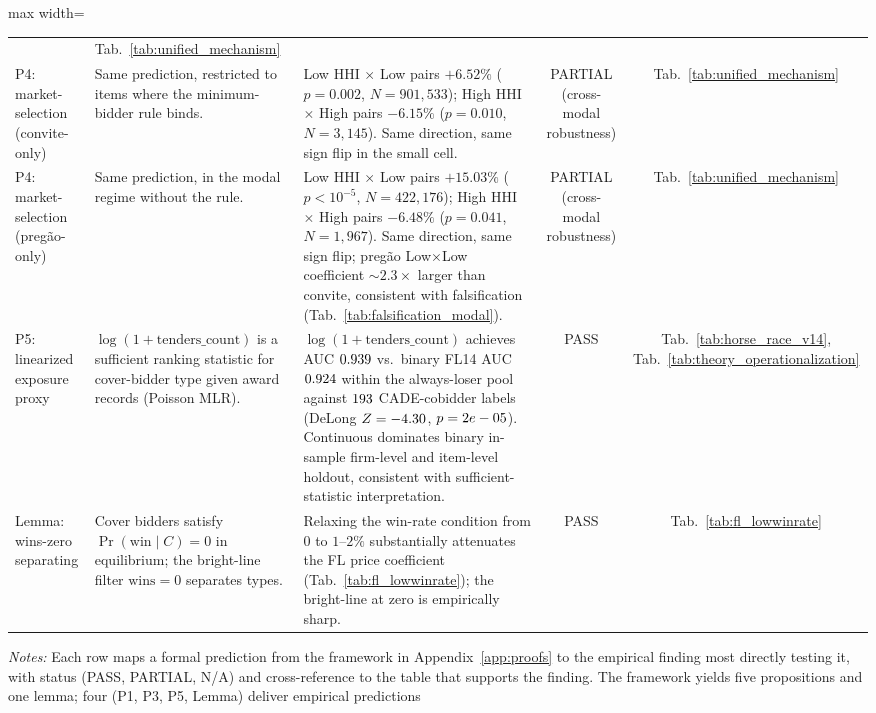 \begin{table}[htbp]
\begin{adjustbox}{max width=\textwidth}
\begin{threeparttable}
\begin{tabular}{p{2.6cm}p{4.0cm}p{5.5cm}cc}
  & Tab.~\ref{tab:unified_mechanism} \\[0.3em]
P4: market-selection (convite-only)
  & Same prediction, restricted to items where the minimum-bidder rule binds.
  & Low HHI $\times$ Low pairs $+6.52\%$ ($p=0.002$, $N=901{,}533$); High HHI $\times$ High pairs $-6.15\%$ ($p=0.010$, $N=3{,}145$). Same direction, same sign flip in the small cell.
  & PARTIAL (cross-modal robustness)
  & Tab.~\ref{tab:unified_mechanism} \\[0.3em]
P4: market-selection (preg\~ao-only)
  & Same prediction, in the modal regime without the rule.
  & Low HHI $\times$ Low pairs $+15.03\%$ ($p<10^{-5}$, $N=422{,}176$); High HHI $\times$ High pairs $-6.48\%$ ($p=0.041$, $N=1{,}967$). Same direction, same sign flip; pregão Low$\times$Low coefficient $\sim$$2.3\!\!\times$ larger than convite, consistent with falsification (Tab.~\ref{tab:falsification_modal}).
  & PARTIAL (cross-modal robustness)
  & Tab.~\ref{tab:unified_mechanism} \\[0.3em]
P5: linearized exposure proxy
  & $\log(1+\text{tenders\_count})$ is a sufficient ranking statistic for cover-bidder type given award records (Poisson MLR).
  & $\log(1+\text{tenders\_count})$ achieves AUC $0.939$ vs.\ binary FL14 AUC $0.924$ within the always-loser pool against $193$ CADE-cobidder labels (DeLong $Z=-4.30$, $p=2e-05$). Continuous dominates binary in-sample firm-level and item-level holdout, consistent with sufficient-statistic interpretation.
  & PASS
  & Tab.~\ref{tab:horse_race_v14}, Tab.~\ref{tab:theory_operationalization} \\[0.3em]
Lemma: wins-zero separating
  & Cover bidders satisfy $\Pr(\text{win}\mid C) = 0$ in equilibrium; the bright-line filter $\text{wins}=0$ separates types.
  & Relaxing the win-rate condition from $0$ to $1$--$2\%$ substantially attenuates the FL price coefficient (Tab.~\ref{tab:fl_lowwinrate}); the bright-line at zero is empirically sharp.
  & PASS
  & Tab.~\ref{tab:fl_lowwinrate} \\
\bottomrule
\end{tabular}
\begin{tablenotes}
\small
\item \textit{Notes:} Each row maps a formal prediction from
the framework in Appendix~\ref{app:proofs} to the empirical
finding most directly testing it, with status (PASS, PARTIAL,
N/A) and cross-reference to the table that supports the
finding. The framework yields five propositions and one
lemma; four (P1, P3, P5, Lemma) deliver empirical predictions

\end{tablenotes}
\end{threeparttable}
\end{adjustbox}
\end{table}
